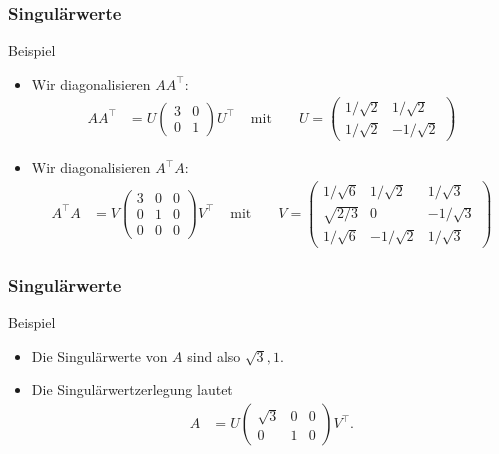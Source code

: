 \documentclass{beamer}
\newcommand{\trans}{\top}
\renewcommand{\ae}{\"a}
\newcommand{\mytitle}{Singul\ae rwerte}
\begin{document}
\begin{frame}\frametitle{\mytitle}
	\begin{block}{Beispiel}
	\begin{itemize}
		\item Wir diagonalisieren $AA^\trans$:
			\begin{align*}
				AA^\trans&=U\begin{pmatrix} 3&0\\0&1 \end{pmatrix}U^\trans&\mbox{ mit }&&U=\begin{pmatrix}
					1/\sqrt 2&1/\sqrt 2\\
					1/\sqrt 2&-1/\sqrt 2
				\end{pmatrix}
			\end{align*}
		\item Wir diagonalisieren $A^\trans A$:
			\begin{align*}
				A^\trans A&=V\begin{pmatrix}3&0&0\\0&1&0\\0&0&0\end{pmatrix}V^\trans&\mbox{ mit }&&
					V=\begin{pmatrix}
						1/\sqrt6&1/\sqrt 2&1/\sqrt3\\
						\sqrt{2/3}&0&-1/\sqrt3\\
						1/\sqrt6&-1/\sqrt2&1/\sqrt3
				\end{pmatrix}
			\end{align*}
	\end{itemize}
	\end{block}
\end{frame}

\begin{frame}\frametitle{\mytitle}
	\begin{block}{Beispiel}
	\begin{itemize}
		\item Die Singul\ae rwerte von $A$ sind also $\sqrt 3,1$.
		\item Die Singul\ae rwertzerlegung lautet
			\begin{align*}
				A&=U\begin{pmatrix} \sqrt 3&0&0\\0&1&0 \end{pmatrix}V^\trans.
			\end{align*}
	\end{itemize}
	\end{block}
\end{frame}
\end{document}
